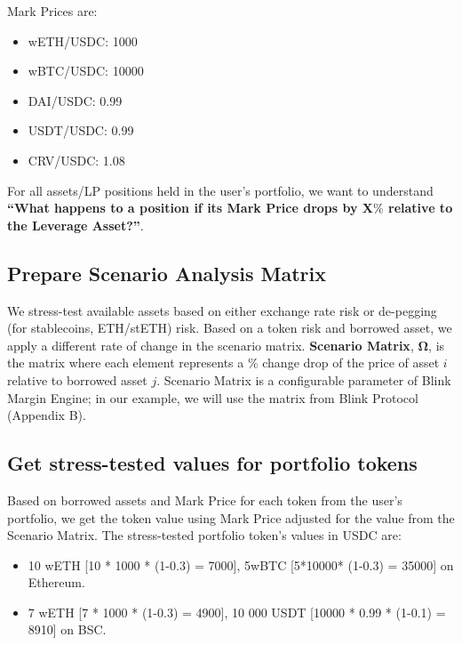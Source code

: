 \documentclass[conference]{IEEEtran}
\begin{document}
Mark Prices are:

\begin{itemize}
	\item wETH/USDC: 1000
	\item wBTC/USDC: 10000
	\item DAI/USDC: 0.99
	\item USDT/USDC: 0.99
	\item CRV/USDC: 1.08
\end{itemize}

For all assets/LP positions held in the user's portfolio, we want to understand \textbf{“What happens to a position if its Mark Price drops by X$\%$ relative to the Leverage Asset?”}. 

\subsection{Prepare Scenario Analysis Matrix}
We stress-test available assets based on either exchange rate risk or de-pegging (for stablecoins, ETH/stETH) risk. Based on a token risk and borrowed asset, we apply a different rate of change in the scenario matrix. \textbf{Scenario Matrix}, $\boldsymbol{\Omega}$, is the matrix where each element represents a $\%$ change drop of the price of asset $i$ relative to borrowed asset $j$. Scenario Matrix is a configurable parameter of Blink Margin Engine; in our example, we will use the matrix from Blink Protocol (Appendix B).



\subsection{Get stress-tested values for portfolio tokens}
Based on borrowed assets and Mark Price for each token from the user’s portfolio, we get the token value using Mark Price adjusted for the value from the Scenario Matrix. The stress-tested portfolio token’s values in USDC are:
\begin{itemize}
	\item 10 wETH [10 * 1000 * (1-0.3) = 7000], 5wBTC [5*10000* (1-0.3) = 35000] on Ethereum.
	\item 7 wETH [7 * 1000 * (1-0.3) = 4900], 10 000 USDT [10000 * 0.99 * (1-0.1) = 8910] on BSC.
\end{itemize}
\end{document}
